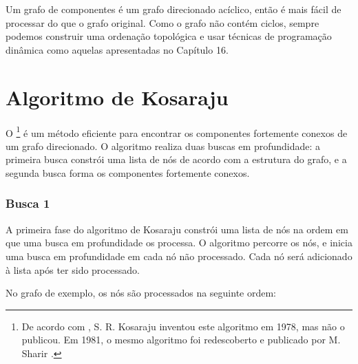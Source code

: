 Um grafo de componentes é um grafo direcionado acíclico,
então é mais fácil de processar do que o grafo original.
Como o grafo não contém ciclos,
sempre podemos construir uma ordenação topológica e
usar técnicas de programação dinâmica como aquelas
apresentadas no Capítulo 16.

\section{Algoritmo de Kosaraju}


O \footnote{De acordo com \cite{aho83},
S. R. Kosaraju inventou este algoritmo em 1978,
mas não o publicou. Em 1981, o mesmo algoritmo foi redescoberto
e publicado por M. Sharir \cite{sha81}.} é um método eficiente
para encontrar os componentes fortemente conexos
de um grafo direcionado.
O algoritmo realiza duas buscas em profundidade:
a primeira busca constrói uma lista de nós
de acordo com a estrutura do grafo,
e a segunda busca forma os componentes fortemente conexos.

\subsubsection{Busca 1}

A primeira fase do algoritmo de Kosaraju constrói
uma lista de nós na ordem em que uma
busca em profundidade os processa.
O algoritmo percorre os nós,
e inicia uma busca em profundidade em cada 
nó não processado.
Cada nó será adicionado à lista
após ter sido processado.

No grafo de exemplo, os nós são processados
na seguinte ordem:
\begin{center}
\end{center}

